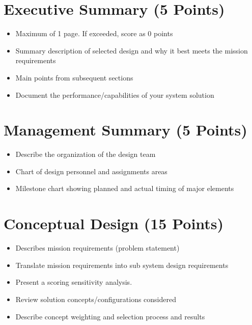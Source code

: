 \documentclass[journal]{byu-aero}
\begin{document}
\setcounter{page}{2}

\tableofcontents %
{}

\newpage


\section{Executive Summary (5 Points)}
\label{sec:ExecutiveSummary}
\begin{itemize}
\item Maximum of 1 page. If exceeded, score as 0 points
\item Summary description of selected design and why it best meets the mission requirements
\item Main points from subsequent sections
\item Document the performance/capabilities of your system solution
\end{itemize}

\section{Management Summary (5 Points)}
\label{sec:ManagementSummary}
\begin{itemize}
\item Describe the organization of the design team
\item Chart of design personnel and assignments areas
\item Milestone chart showing planned and actual timing of major elements
\end{itemize}

\section{Conceptual Design (15 Points)}
\label{sec:ConceptualDesign}
\begin{itemize}
\item Describes mission requirements (problem statement)
\item Translate mission requirements into sub system design requirements
\item Present a scoring sensitivity analysis.
\item Review solution concepts/configurations considered
\item Describe concept weighting and selection process and results
\end{itemize}
\end{document}
